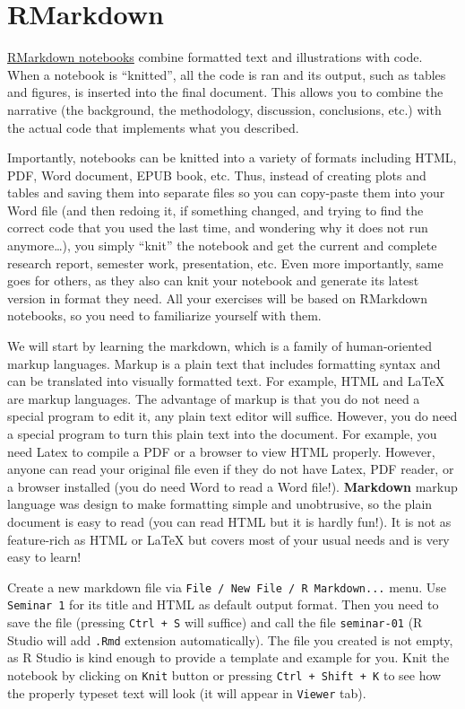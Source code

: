 \documentclass[
]{book}
\begin{document}
\hypertarget{rmarkdown}{%
\section{RMarkdown}\label{rmarkdown}}

\href{https://rmarkdown.rstudio.com/}{RMarkdown notebooks} combine formatted text and illustrations with code. When a notebook is ``knitted'', all the code is ran and its output, such as tables and figures, is inserted into the final document. This allows you to combine the narrative (the background, the methodology, discussion, conclusions, etc.) with the actual code that implements what you described.

Importantly, notebooks can be knitted into a variety of formats including HTML, PDF, Word document, EPUB book, etc. Thus, instead of creating plots and tables and saving them into separate files so you can copy-paste them into your Word file (and then redoing it, if something changed, and trying to find the correct code that you used the last time, and wondering why it does not run anymore\ldots), you simply ``knit'' the notebook and get the current and complete research report, semester work, presentation, etc. Even more importantly, same goes for others, as they also can knit your notebook and generate its latest version in format they need. All your exercises will be based on RMarkdown notebooks, so you need to familiarize yourself with them.

We will start by learning the markdown, which is a family of human-oriented markup languages. Markup is a plain text that includes formatting syntax and can be translated into visually formatted text. For example, HTML and LaTeX are markup languages. The advantage of markup is that you do not need a special program to edit it, any plain text editor will suffice. However, you do need a special program to turn this plain text into the document. For example, you need Latex to compile a PDF or a browser to view HTML properly. However, anyone can read your original file even if they do not have Latex, PDF reader, or a browser installed (you do need Word to read a Word file!). \textbf{Markdown} markup language was design to make formatting simple and unobtrusive, so the plain document is easy to read (you can read HTML but it is hardly fun!). It is not as feature-rich as HTML or LaTeX but covers most of your usual needs and is very easy to learn!

Create a new markdown file via \texttt{File\ /\ New\ File\ /\ R\ Markdown...} menu. Use \texttt{Seminar\ 1} for its title and HTML as default output format. Then you need to save the file (pressing \texttt{Ctrl\ +\ S} will suffice) and call the file \texttt{seminar-01} (R Studio will add \texttt{.Rmd} extension automatically). The file you created is not empty, as R Studio is kind enough to provide a template and example for you. Knit the notebook by clicking on \texttt{Knit} button or pressing \texttt{Ctrl\ +\ Shift\ +\ K} to see how the properly typeset text will look (it will appear in \texttt{Viewer} tab).
\end{document}
